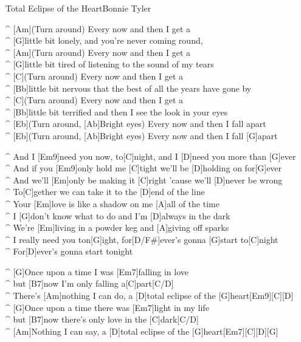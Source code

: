 \begin{song}{Total Eclipse of the Heart}{Bonnie Tyler}

\begin{guitar}
^ [Am](Turn around) Every now and then I get a\\
^ [G]little bit lonely, and you're never coming round,\\
^ [Am](Turn around) Every now and then I get a \\
^ [G]little bit tired of listening to the sound of my tears\\
^ [C](Turn around) Every now and then I get a\\
^ [Bb]little bit nervous that the best of all the years have gone by\\
^ [C](Turn around) Every now and then I get a \\
^ [Bb]little bit terrified and then I see the look in your eyes\\
^ [Eb](Turn around, [Ab]Bright eyes) Every now and then I fall apart\\
^ [Eb](Turn around, [Ab]Bright eyes) Every now and then I fall [G]apart\\
\end{guitar}


\begin{guitar}
^ And I [Em9]need you now, to[C]night, and I [D]need you more than [G]ever\\
^ And if you [Em9]only hold me [C]tight we'll be [D]holding on for[G]ever\\
^ And we'll [Em]only be making it [C]right 'cause we'll [D]never be wrong\\
^ To[C]gether we can take it to the [D]end of the line\\
^ Your [Em]love is like a shadow on me [A]all of the time\\
^ I [G]don't know what to do and I'm [D]always in the dark\\
^ We're [Em]living in a powder keg and [A]giving off sparks\\
^ I really need you ton[G]ight, for[D/F#]ever's gonna [G]start to[C]night\\
^ For[D]ever's gonna start tonight\\
\end{guitar}


\begin{guitar}
^ [G]Once upon a time I was [Em7]falling in love\\
^ but [B7]now I'm only falling a[C]part[C/D]\\
^ There's [Am]nothing I can do, a [D]total eclipse of the [G]heart[Em9][C][D]\\
^ [G]Once upon a time there was [Em7]light in my life \\
^ but [B7]now there's only love in the [C]dark[C/D]\\
^ [Am]Nothing I can say, a [D]total eclipse of the [G]heart[Em7][C][D][G]\\
\end{guitar}




\end{song}
